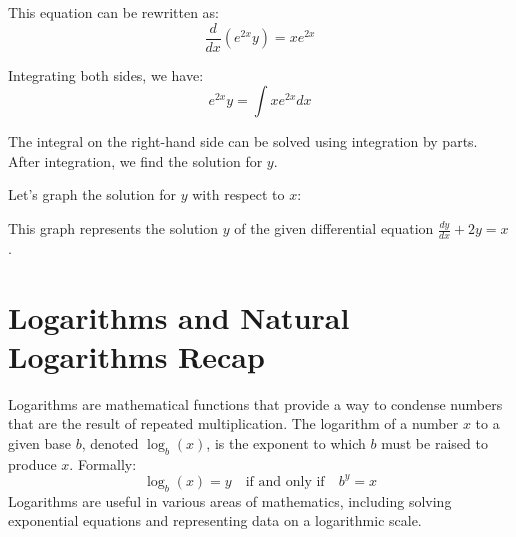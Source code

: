 \documentclass[a4paper,12pt]{article}
\begin{document}
This equation can be rewritten as:
\begin{equation}
    \frac{d}{dx} (e^{2x} y) = xe^{2x}
\end{equation}

Integrating both sides, we have:
\begin{equation}
    e^{2x} y = \int xe^{2x} dx
\end{equation}

The integral on the right-hand side can be solved using integration by parts. After integration, we find the solution for \( y \).

Let's graph the solution for \( y \) with respect to \( x \):

\begin{center}
\end{center}

This graph represents the solution \( y \) of the given differential equation \( \frac{dy}{dx} + 2y = x \).


\section{Logarithms and Natural Logarithms Recap}
Logarithms are mathematical functions that provide a way to condense numbers that are the result of repeated multiplication. The logarithm of a number \( x \) to a given base \( b \), denoted \( \log_b(x) \), is the exponent to which \( b \) must be raised to produce \( x \). Formally:
\begin{equation}
    \log_b(x) = y \quad \text{if and only if} \quad b^y = x
\end{equation}
Logarithms are useful in various areas of mathematics, including solving exponential equations and representing data on a logarithmic scale.
\end{document}
